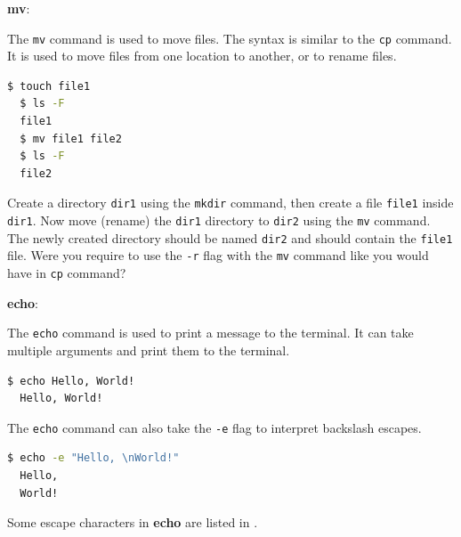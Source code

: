 \textbf{mv}:

The \texttt{mv} command is used to move files.
The syntax is similar to the \texttt{cp} command.
It is used to move files from one location to another, or to rename files.

\begin{lstlisting}[language=bash]
  $ touch file1
  $ ls -F
  file1
  $ mv file1 file2
  $ ls -F
  file2
\end{lstlisting}

\begin{exercise}
  Create a directory \texttt{dir1} using the \texttt{mkdir} command, then create a file \texttt{file1} inside \texttt{dir1}.
  Now move (rename) the \texttt{dir1} directory to \texttt{dir2} using the \texttt{mv} command.
  The newly created directory should be named \texttt{dir2} and should contain the \texttt{file1} file.
  Were you require to use the \texttt{-r} flag with the \texttt{mv} command like you would have in \texttt{cp} command?
\end{exercise}

\textbf{echo}:

The \texttt{echo} command is used to print a message to the terminal.
It can take multiple arguments and print them to the terminal.

\begin{lstlisting}[language=bash]
  $ echo Hello, World!
  Hello, World!
\end{lstlisting}

The \texttt{echo} command can also take the \texttt{-e} flag to interpret backslash escapes.

\begin{lstlisting}[language=bash]
  $ echo -e "Hello, \nWorld!"
  Hello,
  World!
\end{lstlisting}

Some escape characters in \textbf{echo} are listed in .

